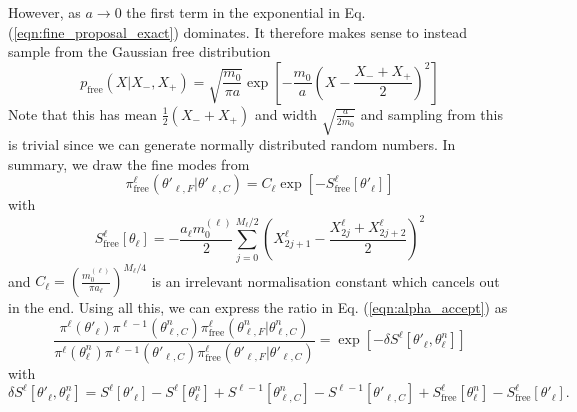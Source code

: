 \documentclass[11pt]{article}
\begin{document}
However, as $a\rightarrow 0$ the first term in the exponential in Eq. (\ref{eqn:fine_proposal_exact}) dominates. It therefore makes sense to instead sample from the Gaussian free distribution
\begin{equation}
  p_{\text{free}}(X|X_-,X_+) = \sqrt{\frac{m_0}{\pi a}}\exp\left[-\frac{m_0}{a}\left(X-\frac{X_-+X_+}{2}\right)^2\right]
\end{equation}
Note that this has mean $\frac{1}{2}(X_-+X_+)$ and width $\sqrt{\frac{a}{2m_0}}$ and sampling from this is trivial since we can generate normally distributed random numbers. In summary, we draw the fine modes from
\begin{equation}
  \pi^\ell_{\text{free}}(\theta'_{\ell,F}|\theta'_{\ell,C}) =
  C_\ell
  \exp\left[-S^\ell_{\text{free}}[\theta'_\ell]\right]
\end{equation}
with
\begin{equation}
  S^\ell_\text{free}[\theta_\ell] = 
  -\frac{a_\ell m^{(\ell)}_0}{2}\sum_{j=0}^{M_\ell/2} \left(X^\ell_{2j+1}-\frac{X^\ell_{2j}+X^\ell_{2j+2}}{2}\right)^2
\end{equation}
and $C_\ell = \left(\frac{m^{(\ell)}_0}{\pi a_\ell}\right)^{M_{\ell}/4}$ is an irrelevant normalisation constant which cancels out in the end.
Using all this, we can express the ratio in Eq. (\ref{eqn:alpha_accept}) as
\begin{equation}
  \frac{\pi^\ell(\theta'_\ell)\pi^{\ell-1}(\theta_{\ell,C}^n)\pi^\ell_{\text{free}}(\theta_{\ell,F}^n|\theta_{\ell,C}^n)}{\pi^\ell(\theta_\ell^n)\pi^{\ell-1}(\theta'_{\ell,C})\pi^\ell_{\text{free}}(\theta'_{\ell,F}|\theta'_{\ell,C})}
  = \exp\left[-\delta S^{\ell}[\theta'_\ell,\theta^n_\ell]\right]
\end{equation}
with
\begin{equation}
  \delta S^\ell[\theta'_\ell,\theta^n_\ell] =
  S^\ell[\theta'_\ell] - S^\ell[\theta^n_\ell] +
  S^{\ell-1}[\theta^n_{\ell,C}] - S^{\ell-1}[\theta'_{\ell,C}] +
  S^{\ell}_{\text{free}}[\theta^n_{\ell}] - S^{\ell}_{\text{free}}[\theta'_{\ell}].
  \end{equation}
\end{document}
